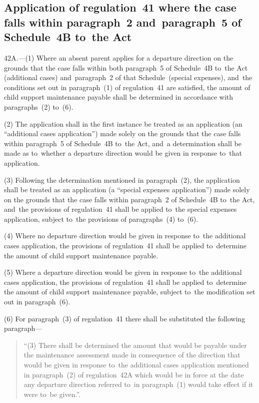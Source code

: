 \documentclass[12pt,a4paper]{article}
\begin{document}
\subsection[42A. Application of regulation~41 where the case falls within paragraph~2 and~paragraph~5 of Schedule~4B to~the Act]{Application of regulation~41 where the case falls within paragraph~2 and~paragraph~5 of Schedule~4B to~the Act}

42A.—(1) Where an absent parent applies for a departure direction on the grounds that the case falls within both paragraph~5 of Schedule~4B to~the Act (additional cases) and~paragraph~2 of that Schedule~(special expenses), and~the conditions set out in paragraph~(1) of regulation~41 are satisfied, the amount of child support maintenance payable shall be determined in accordance with paragraphs~(2) to~(6).

(2) The application shall in the first instance be treated as an application (an “additional cases application”) made solely on the grounds that the case falls within paragraph~5 of Schedule~4B to~the Act, and~a determination shall be made as to~whether a departure direction would be given in response to~that application.

(3) Following the determination mentioned in paragraph~(2), the application shall be treated as an application (a “special expenses application”) made solely on the grounds that the case falls within paragraph~2 of Schedule~4B to~the Act, and~the provisions of regulation~41 shall be applied to~the special expenses application, subject to~the provisions of paragraphs~(4) to~(6).

(4) Where no departure direction would be given in response to~the additional cases application, the provisions of regulation~41 shall be applied to~determine the amount of child support maintenance payable.

(5) Where a departure direction would be given in response to~the additional cases application, the provisions of regulation~41 shall be applied to~determine the amount of child support maintenance payable, subject to~the modification set out in paragraph~(6).

(6) For paragraph~(3) of regulation~41 there shall be substituted the following paragraph—
\begin{quotation}
“(3) There shall be determined the amount that would be payable under the maintenance assessment made in consequence of the direction that would be given in response to~the additional cases application mentioned in paragraph~(2) of regulation~42A which would be in force at the date any departure direction referred to~in paragraph~(1) would take effect if it were to~be given.”.
\end{quotation}
\end{document}
